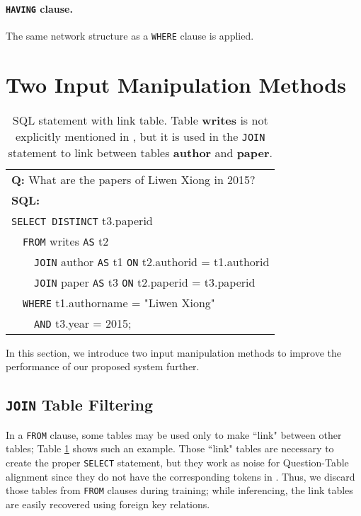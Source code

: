 \documentclass[11pt,a4paper]{article}
\begin{document}
\paragraph{\texttt{HAVING} clause.} The same network structure as a \texttt{WHERE} clause is applied.


\section{Two Input Manipulation Methods}
\label{sec:data}

\begin{table}
\centering
\begin{tabular}{|l|} \hline
\textbf{Q:} What are the papers of Liwen Xiong in 2015? \\
\textbf{SQL:} \\
\texttt{SELECT DISTINCT} t3.paperid \\
~~\texttt{FROM} writes \texttt{AS} t2 \\
~~~~\texttt{JOIN} author \texttt{AS} t1 \texttt{ON} t2.authorid  =  t1.authorid \\
~~~~\texttt{JOIN} paper \texttt{AS} t3 \texttt{ON} t2.paperid  =  t3.paperid  \\
~~\texttt{WHERE} t1.authorname  =  "Liwen Xiong"  \\
~~~~\texttt{AND} t3.year  =  2015; \\ \hline
\end{tabular}
\caption{SQL statement with link table. Table \textbf{writes} is not explicitly mentioned in , but it is used in the \texttt{JOIN} statement to link between tables \textbf{author} and \textbf{paper}.}
\label{tbl:linktbl}
\end{table}

In this section, we introduce two input manipulation methods to improve the performance of our proposed system further.

\subsection{\texttt{JOIN} Table Filtering}
In a \texttt{FROM} clause, some tables may be used only to make ``link" between other tables; Table \ref{tbl:linktbl} shows such an example. Those ``link" tables are necessary to create the proper \texttt{SELECT} statement, but they work as noise for Question-Table alignment since they do not have the corresponding tokens in . Thus, we discard those tables from \texttt{FROM} clauses during training; while inferencing, the link tables are easily recovered using foreign key relations.
 
\end{document}
